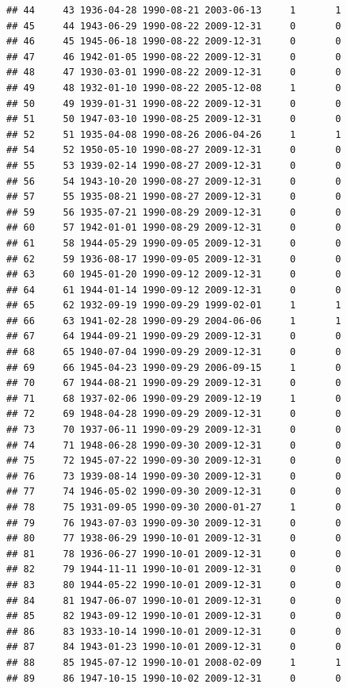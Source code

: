 \documentclass[
]{book}
\theoremstyle{definition}
\theoremstyle{definition}
\theoremstyle{definition}
\theoremstyle{definition}
\theoremstyle{remark}
\begin{document}
\begin{verbatim}
## 44     43 1936-04-28 1990-08-21 2003-06-13     1       1
## 45     44 1943-06-29 1990-08-22 2009-12-31     0       0
## 46     45 1945-06-18 1990-08-22 2009-12-31     0       0
## 47     46 1942-01-05 1990-08-22 2009-12-31     0       0
## 48     47 1930-03-01 1990-08-22 2009-12-31     0       0
## 49     48 1932-01-10 1990-08-22 2005-12-08     1       0
## 50     49 1939-01-31 1990-08-22 2009-12-31     0       0
## 51     50 1947-03-10 1990-08-25 2009-12-31     0       0
## 52     51 1935-04-08 1990-08-26 2006-04-26     1       1
## 54     52 1950-05-10 1990-08-27 2009-12-31     0       0
## 55     53 1939-02-14 1990-08-27 2009-12-31     0       0
## 56     54 1943-10-20 1990-08-27 2009-12-31     0       0
## 57     55 1935-08-21 1990-08-27 2009-12-31     0       0
## 59     56 1935-07-21 1990-08-29 2009-12-31     0       0
## 60     57 1942-01-01 1990-08-29 2009-12-31     0       0
## 61     58 1944-05-29 1990-09-05 2009-12-31     0       0
## 62     59 1936-08-17 1990-09-05 2009-12-31     0       0
## 63     60 1945-01-20 1990-09-12 2009-12-31     0       0
## 64     61 1944-01-14 1990-09-12 2009-12-31     0       0
## 65     62 1932-09-19 1990-09-29 1999-02-01     1       1
## 66     63 1941-02-28 1990-09-29 2004-06-06     1       1
## 67     64 1944-09-21 1990-09-29 2009-12-31     0       0
## 68     65 1940-07-04 1990-09-29 2009-12-31     0       0
## 69     66 1945-04-23 1990-09-29 2006-09-15     1       0
## 70     67 1944-08-21 1990-09-29 2009-12-31     0       0
## 71     68 1937-02-06 1990-09-29 2009-12-19     1       0
## 72     69 1948-04-28 1990-09-29 2009-12-31     0       0
## 73     70 1937-06-11 1990-09-29 2009-12-31     0       0
## 74     71 1948-06-28 1990-09-30 2009-12-31     0       0
## 75     72 1945-07-22 1990-09-30 2009-12-31     0       0
## 76     73 1939-08-14 1990-09-30 2009-12-31     0       0
## 77     74 1946-05-02 1990-09-30 2009-12-31     0       0
## 78     75 1931-09-05 1990-09-30 2000-01-27     1       0
## 79     76 1943-07-03 1990-09-30 2009-12-31     0       0
## 80     77 1938-06-29 1990-10-01 2009-12-31     0       0
## 81     78 1936-06-27 1990-10-01 2009-12-31     0       0
## 82     79 1944-11-11 1990-10-01 2009-12-31     0       0
## 83     80 1944-05-22 1990-10-01 2009-12-31     0       0
## 84     81 1947-06-07 1990-10-01 2009-12-31     0       0
## 85     82 1943-09-12 1990-10-01 2009-12-31     0       0
## 86     83 1933-10-14 1990-10-01 2009-12-31     0       0
## 87     84 1943-01-23 1990-10-01 2009-12-31     0       0
## 88     85 1945-07-12 1990-10-01 2008-02-09     1       1
## 89     86 1947-10-15 1990-10-02 2009-12-31     0       0

\end{verbatim}
\end{document}
